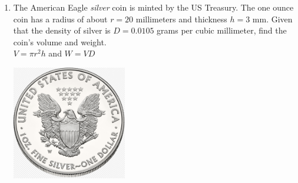 \begin{enumerate}
\item The American Eagle \emph{silver} coin is minted by the US Treasury. The one ounce coin has a radius of about $r=20$ millimeters and thickness $h=3$ mm. Given that the density of silver is $D = 0.0105$ grams per cubic millimeter, find the coin's volume and weight. \\[0.25cm]
  $\displaystyle V = \pi r^2 h$ and $W=VD$
    \begin{flushright}
      \includegraphics[width=5cm]{../graphics/04coin.png}
    \end{flushright}

\end{enumerate}
